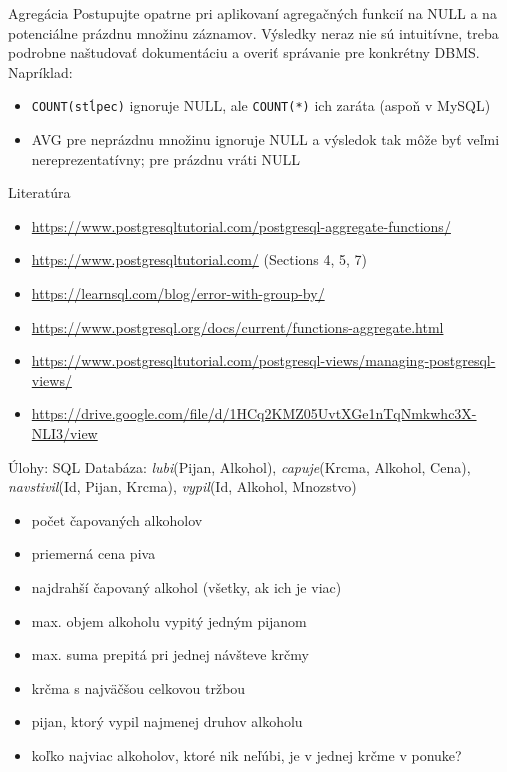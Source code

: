 \documentclass[12pt]{beamer}
\begin{document}
\begin{frame}[fragile]{Agregácia}
Postupujte opatrne pri aplikovaní agregačných funkcií na NULL a na potenciálne prázdnu množinu záznamov.
Výsledky neraz nie sú intuitívne, treba podrobne naštudovať dokumentáciu a overiť správanie pre konkrétny DBMS.
Napríklad:
\begin{itemize}
\item \verb|COUNT(stĺpec)| ignoruje NULL, ale \verb|COUNT(*)| ich zaráta (aspoň v MySQL)
\item AVG pre neprázdnu množinu ignoruje NULL a výsledok tak môže byť veľmi nereprezentatívny; pre prázdnu vráti NULL
\end{itemize}
\end{frame}



\begin{frame}{Literatúra}
\begin{itemize}
\item {\scriptsize\url{https://www.postgresqltutorial.com/postgresql-aggregate-functions/}}
\item {\scriptsize\url{https://www.postgresqltutorial.com/} (Sections 4, 5, 7)}
\item {\scriptsize\url{https://learnsql.com/blog/error-with-group-by/}}
\item {\scriptsize\url{https://www.postgresql.org/docs/current/functions-aggregate.html}}
\item {\scriptsize\url{https://www.postgresqltutorial.com/postgresql-views/managing-postgresql-views/}}
\item {\scriptsize\url{https://drive.google.com/file/d/1HCq2KMZ05UvtXGe1nTqNmkwhc3X-NLI3/view}}
\end{itemize}
\end{frame}


\begin{frame}{Úlohy: SQL}
Databáza: \emph{lubi}(Pijan, Alkohol), \emph{capuje}(Krcma, Alkohol, Cena),
\emph{navstivil}(Id, Pijan, Krcma), \emph{vypil}(Id, Alkohol, Mnozstvo)
\begin{itemize}
	\item počet čapovaných alkoholov
	\item priemerná cena piva
	\item najdrahší čapovaný alkohol (všetky, ak ich je viac)
    \item max. objem alkoholu vypitý jedným pijanom
    \item max. suma prepitá pri jednej návšteve krčmy
    \item krčma s najväčšou celkovou tržbou
    \item pijan, ktorý vypil najmenej druhov alkoholu
    \item koľko najviac alkoholov, ktoré nik neľúbi, je v jednej krčme v ponuke?
\end{itemize}
\end{frame}
\end{document}

